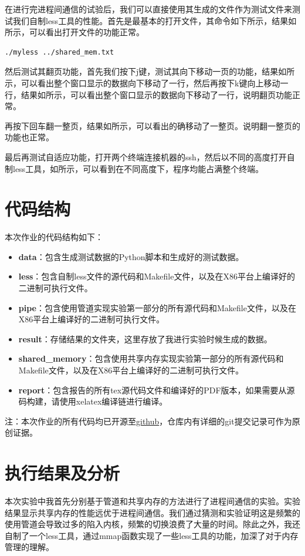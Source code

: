 \documentclass[lang=cn,a4paper,newtx]{elegantpaper}
\begin{document}
在进行完进程间通信的试验后，我们可以直接使用其生成的文件作为测试文件来测试我们自制less工具的性能。首先是最基本的打开文件，其命令如下所示，结果如所示，可以看出打开文件的功能正常。
\begin{lstlisting}[language=bash]
    ./myless ../shared_mem.txt
\end{lstlisting}

然后测试其翻页功能，首先我们按下j键，测试其向下移动一页的功能，结果如所示，可以看出整个窗口显示的数据向下移动了一行，然后再按下k键向上移动一行，结果如所示，可以看出整个窗口显示的数据向下移动了一行，说明翻页功能正常。

再按下回车翻一整页，结果如所示，可以看出的确移动了一整页。说明翻一整页的功能也正常。

最后再测试自适应功能，打开两个终端连接机器的ssh，然后以不同的高度打开自制less工具，如所示，可以看到在不同高度下，程序均能占满整个终端。

\section{代码结构}

本次作业的代码结构如下：
\begin{itemize}
    \item \textbf{data}：包含生成测试数据的Python脚本和生成好的测试数据。
    \item \textbf{less}：包含自制less文件的源代码和Makefile文件，以及在X86平台上编译好的二进制可执行文件。
    \item \textbf{pipe}：包含使用管道实现实验第一部分的所有源代码和Makefile文件，以及在X86平台上编译好的二进制可执行文件。
    \item \textbf{result}：存储结果的文件夹，这里存放了我进行实验时候生成的数据。
    \item \textbf{shared\_memory}：包含使用共享内存实现实验第一部分的所有源代码和Makefile文件，以及在X86平台上编译好的二进制可执行文件。
    \item  \textbf{report}：包含报告的所有tex源代码文件和编译好的PDF版本，如果需要从源码构建，请使用xelatex编译链进行编译。
\end{itemize}

注：本次作业的所有代码均已开源至\href{https://github.com/wtyqqq/OS_Assignment}{github}，仓库内有详细的git提交记录可作为原创证据。
\section{执行结果及分析}

本次实验中我首先分别基于管道和共享内存的方法进行了进程间通信的实验。实验结果显示共享内存的性能远优于进程间通信。我们通过猜测和实验证明这是频繁的使用管道会导致过多的陷入内核，频繁的切换浪费了大量的时间。除此之外，我还自制了一个less工具，通过mmap函数实现了一些less工具的功能，加深了对于内存管理的理解。
% 
\printbibliography[heading=bibintoc, title=\ebibname,sorting=none]

\appendix
\addappheadtotoc
\end{document}
